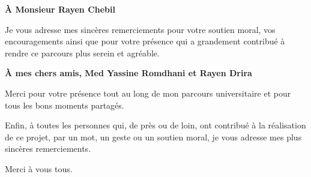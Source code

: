 \vspace{0.3cm}

{\centering
\textbf{\large À Monsieur Rayen Chebil}\par
}

Je vous adresse mes sincères remerciements pour votre soutien moral, vos encouragements ainsi que pour votre présence qui a grandement contribué à rendre ce parcours plus serein et agréable.
\vspace{0.3cm}

{\centering
\textbf{\large À mes chers amis, Med Yassine Romdhani et Rayen Drira}\par
}

Merci pour votre présence tout au long de mon parcours universitaire et pour tous les bons moments partagés.

\vspace{0.3cm}

\noindent Enfin, à toutes les personnes qui, de près ou de loin, ont contribué à la réalisation de ce projet, par un mot, un geste ou un soutien moral, je vous adresse mes plus sincères remerciements.

Merci à vous tous.

